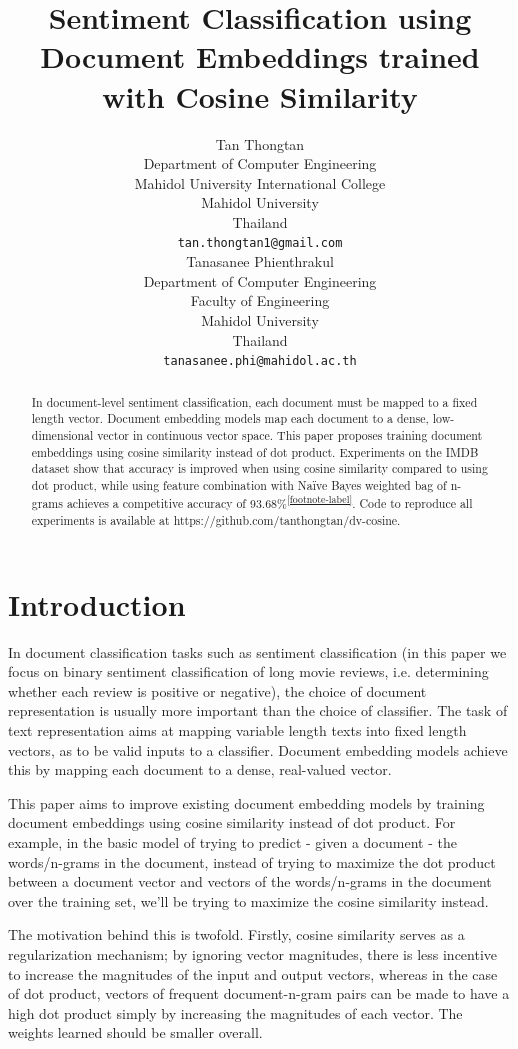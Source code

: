 \documentclass[11pt,a4paper]{article}
\title{Sentiment Classification using Document Embeddings trained with Cosine Similarity}
\author{Tan Thongtan \\
  Department of Computer Engineering \\
  Mahidol University International College \\
  Mahidol University \\
  Thailand \\
  \texttt{tan.thongtan1@gmail.com} \\\And
  Tanasanee Phienthrakul \\
  Department of Computer Engineering \\
  Faculty of Engineering \\
  Mahidol University \\
  Thailand \\
  \texttt{tanasanee.phi@mahidol.ac.th} \\}
\date{}
\begin{document}
\maketitle
\begin{abstract}
In document-level sentiment classification, each document must be mapped to a fixed length vector. Document embedding models map each document to a dense, low-dimensional vector in continuous vector space. This paper proposes training document embeddings using cosine similarity instead of dot product. Experiments on the IMDB dataset show that accuracy is improved when using cosine similarity compared to using dot product, while using feature combination with Naïve Bayes weighted bag of n-grams achieves a competitive accuracy of 93.68\%\textsuperscript{\ref{footnote-label}}. Code to reproduce all experiments is available at https://github.com/tanthongtan/dv-cosine. 
\end{abstract}

\section{Introduction}



In document classification tasks such as sentiment classification (in this paper we focus on binary sentiment classification of long movie reviews, i.e. determining whether each review is positive or negative), the choice of document representation is usually more important than the choice of classifier. The task of text representation aims at mapping variable length texts into fixed length vectors, as to be valid inputs to a classifier. Document embedding models achieve this by mapping each document to a dense, real-valued vector. 

This paper aims to improve existing document embedding models \cite{le2014,li2016a} by training document embeddings
using cosine similarity instead of dot product. For example, in the basic model of trying to
predict - given a document - the words/n-grams in the document, instead of
trying to maximize the dot product between a document vector
and vectors of the words/n-grams in the document over the training set, we'll be trying to
maximize the cosine similarity instead. 

The motivation behind this is twofold. Firstly, cosine similarity serves as a regularization mechanism; by
ignoring vector magnitudes, there is less incentive to increase the magnitudes of the 
input and output vectors, whereas in the case of dot product, vectors of frequent document-n-gram pairs can be made to have a 
high dot product simply by increasing the magnitudes of each vector. The weights learned should be smaller
overall. 
\end{document}
